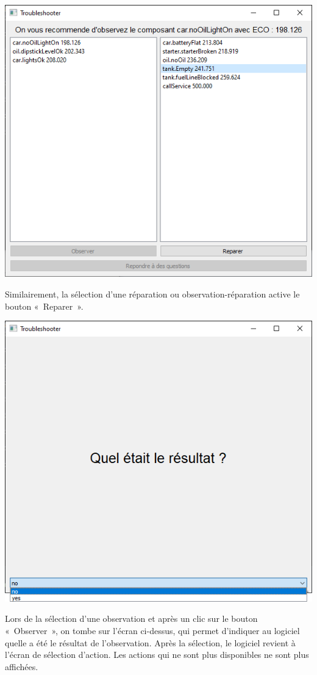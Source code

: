 \documentclass[a4paper,11pt]{article}
\theoremstyle{plain}
\theoremstyle{definition}
\begin{document}
\begin{center}
\includegraphics[scale=0.667]{Figures/myope_3}
\end{center}
Similairement, la sélection d'une réparation ou observation-réparation active le bouton «~Reparer~».

\begin{center}
\includegraphics[scale=0.667]{Figures/observacao}
\end{center}
Lors de la sélection d'une observation et après un clic sur le bouton «~Observer~», on tombe sur l'écran ci-dessus, qui permet d'indiquer au logiciel quelle a été le résultat de l'observation. Après la sélection, le logiciel revient à l'écran de sélection d'action. Les actions qui ne sont plus disponibles ne sont plus affichées.
\end{document}
